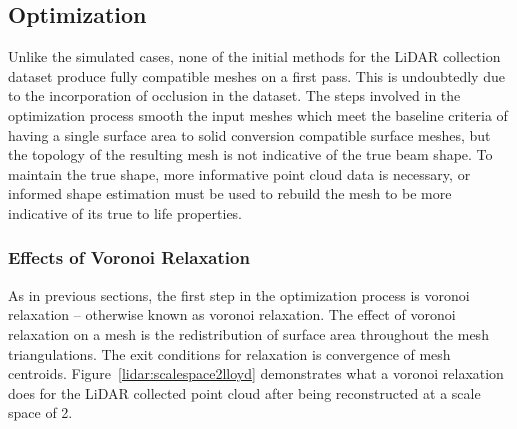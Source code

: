 \documentclass[12pt]{drexelthesis}
\let\Oldsubsection\subsection
\renewcommand{\subsection}{\FloatBarrier\Oldsubsection}
\let\Oldsubsubsection\subsubsection
\renewcommand{\subsubsection}{\FloatBarrier\Oldsubsubsection}
\begin{document}
\subsection{Optimization}

Unlike the simulated cases, none of the initial methods for the LiDAR collection dataset produce fully compatible meshes on a first pass. This is undoubtedly due to the incorporation of occlusion in the dataset. The steps involved in the optimization process smooth the input meshes which meet the baseline criteria of having a single surface area to solid conversion compatible surface meshes, but the topology of the resulting mesh is not indicative of the true beam shape. To maintain the true shape, more informative point cloud data is necessary, or informed shape estimation must be used to rebuild the mesh to be more indicative of its true to life properties.

\subsubsection{Effects of Voronoi Relaxation}

As in previous sections, the first step in the optimization process is voronoi relaxation -- otherwise known as voronoi relaxation. The effect of voronoi relaxation on a mesh is the redistribution of surface area throughout the mesh triangulations. The exit conditions for relaxation is convergence of mesh centroids. Figure~\ref{lidar:scalespace2lloyd} demonstrates what a voronoi relaxation does for the LiDAR collected point cloud after being reconstructed at a scale space of 2.
\end{document}
